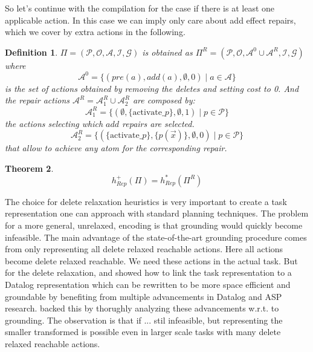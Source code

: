 \documentclass[twocolumn]{article}
\newcommand{\task}{\ensuremath{\Pi}\xspace}
\newcommand{\preds}{\ensuremath{\mathcal{P}}\xspace}
\newcommand{\acts}{\ensuremath{\mathcal{A}}\xspace}
\newcommand{\objects}{\ensuremath{\mathcal{O}}\xspace}
\newcommand{\init}{\ensuremath{\mathcal{I}}\xspace}
\newcommand{\goal}{\ensuremath{\mathcal{G}}\xspace}
\newcommand{\someVar}{\ensuremath{x}\xspace}
\newcommand{\someAtom}{\ensuremath{p(\vec{\someVar})}\xspace}
\newcommand{\somePred}{\ensuremath{p}\xspace}
\newcommand{\prename}{\ensuremath{pre}\xspace}
\newcommand{\addname}{\ensuremath{add}\xspace}
\newcommand{\pre}[1]{\ensuremath{\prename(#1)}\xspace}
\newcommand{\add}[1]{\ensuremath{\addname(#1)}\xspace}
\newcommand{\someAct}{\ensuremath{a}\xspace}
\newcommand{\optimalHeuristic}{\ensuremath{h^{*}_{Rep}}\xspace}
\newcommand{\optimalHeuristicRel}{\ensuremath{h^{+}_{Rep}}\xspace}
\newtheorem{theorem}{Theorem}
\newtheorem{definition}[theorem]{Definition}
\begin{document}
	So let's continue with the compilation for the case if there is at least one applicable action. 
	In this case we can imply only care about add effect repairs, which we cover by extra actions in the following.
	
	\begin{definition}
		
		$\task = (\preds, \objects, \acts, \init, \goal)$
		is obtained as
		$\task^{R} = (\preds, \objects, \acts^0 \cup \acts^{R}, \init, \goal)$
		where 
		$$
		\acts^0 = \{
		(\pre{\someAct}, \add{\someAct}, \emptyset, 0) \mid \someAct \in \acts
		\}
		$$
		is the set of actions obtained by removing the deletes and setting cost to 0.
		And the repair actions $\acts^{R} = \acts^{R}_1 \cup \acts^{R}_2$ are composed by:
		$$
		\acts^{R}_1 = 
		\{
		(\emptyset, \{\text{activate\_}\somePred\}, \emptyset, 1) \mid \somePred \in \preds
		\}
		$$
		the actions selecting which \addname repairs are selected.
		$$
		\acts^{R}_2
		= \{
		(\{\text{activate\_}\somePred\}, \{\someAtom\}, \emptyset, 0) \mid \somePred \in \preds
		\}$$
		that allow to achieve any atom for the corresponding repair.
	\end{definition}
	
	\begin{theorem}
		$$\optimalHeuristicRel(\task) = \optimalHeuristic(\task^{R})$$
	\end{theorem}
	
	\smallskip
	
	The choice for delete relaxation heuristics is very important to create a task representation one can approach with standard planning techniques.
	The problem for a more general, unrelaxed,  encoding is that grounding would quickly become infeasible.
	The main advantage of the state-of-the-art grounding procedure \citep{helmert:aij-09} comes from only representing all delete relaxed reachable actions. 
	Here all actions become delete relaxed reachable.
	We need these actions in the actual task.
	But for the delete relaxation, \cite{helmert:aij-09} and \cite{correa:etal:icaps-21} showed how to link the task representation to a Datalog representation which can be rewritten to be more space efficient and groundable by 
	benefiting from multiple advancements in Datalog and ASP research.
	\cite{correa:etal:icaps-23} backed this by thorughly analyzing these advancements w.r.t. to grounding.
	The observation is that if ... stil infeasible, but representing the smaller transformed is possible even in larger scale tasks with many delete relaxed reachable actions.
	
\end{document}
